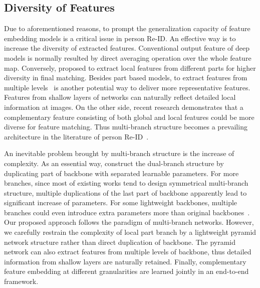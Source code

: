 \documentclass[journal]{IEEEtran}
\begin{document}
\subsection{Diversity of Features}
Due to aforementioned reasons, to prompt the generalization capacity of feature embedding models is a critical issue in person Re-ID.
An effective way is to increase the diversity of extracted features.
Conventional output feature of deep models is normally resulted by direct averaging operation over the whole feature map.
Conversely, \cite{sun2018beyond} proposed to extract local features from different parts for higher diversity in final matching.
Besides part based models, to extract features from multiple levels~\cite{8578346,8237839} is another potential way to deliver more representative features.
Features from shallow layers of networks can naturally reflect detailed local information at images.
On the other side, recent research demonstrates that a complementary feature consisting of both global and local features could be more diverse for feature matching.
Thus multi-branch structure becomes a prevailing architecture in the literature of person Re-ID~\cite{chen2019ABD,yang2019CAMA,10.1007/978-3-030-60636-7_2,zheng2019pyramidal}.

An inevitable problem brought by multi-branch structure is the increase of complexity.
As an essential way, \cite{chen2019ABD,9094042} construct the dual-branch structure by duplicating part of backbone with separated learnable parameters.
For more branches, since most of existing works tend to design symmetrical multi-branch structure, multiple duplications of the last part of backbone apparently lead to significant increase of parameters. 
For some lightweight backbones, multiple branches could even introduce extra parameters more than original backbones~\cite{lawen2019attention,10.1007/978-3-030-60636-7_2}.
Our proposed approach follows the paradigm of multi-branch networks.
However, we carefully restrain the complexity of local part branch by a lightweight pyramid network structure rather than direct duplication of backbone.
The pyramid network can also extract features from multiple levels of backbone, thus detailed information from shallow layers are naturally retained.
Finally, complementary feature embedding at different granularities are learned jointly in an end-to-end framework.
\end{document}
